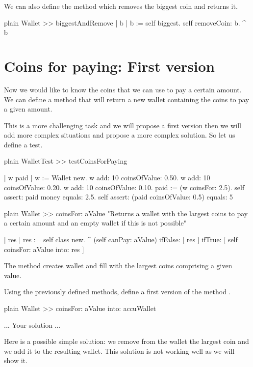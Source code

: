 \documentclass[10pt,twoside,english]{_support/latex/sbabook/sbabook}
\begin{document}
We can also define the method  which removes the biggest coin and returns it.

\begin{displaycode}{plain}
Wallet >> biggestAndRemove
	| b |
	b := self biggest.
	self removeCoin: b.
	^ b	
\end{displaycode}
\section{Coins for paying: First version}
Now we would like to know the coins that we can use to pay a certain amount. 
We can define a method  that will return a new wallet containing the coins to 
pay a given amount.

This is a more challenging task and we will propose a first version then we will add more complex situations
and propose a more complex solution. So let us define a test.

\begin{displaycode}{plain}
WalletTest >> testCoinsForPaying

	| w paid |
	w := Wallet new.
	w add: 10 coinsOfValue: 0.50.
	w add: 10 coinsOfValue: 0.20.
	w add: 10 coinsOfValue: 0.10.
	paid := (w coinsFor: 2.5).
	self assert: paid money equals: 2.5.
	self assert: (paid coinsOfValue: 0.5) equals: 5 
\end{displaycode}

\begin{displaycode}{plain}
Wallet >> coinsFor: aValue
	"Returns a wallet with the largest coins to pay a certain amount and an empty wallet if this is not possible"
	
	| res |
	res := self class new.
	^ (self canPay: aValue)
		ifFalse: [ res ]
		ifTrue: [ self coinsFor: aValue into: res ] 
\end{displaycode}

The method  creates wallet and fill with the largest coins comprising a given value.

Using the previously defined methods, define a first version of the method .

\begin{displaycode}{plain}
Wallet >> coinsFor: aValue into: accuWallet	

	... Your solution ...
\end{displaycode}

Here is a possible simple solution: we remove from the wallet the largest coin and we add it to the resulting wallet.
This solution is not working well as we will show it.
\end{document}
